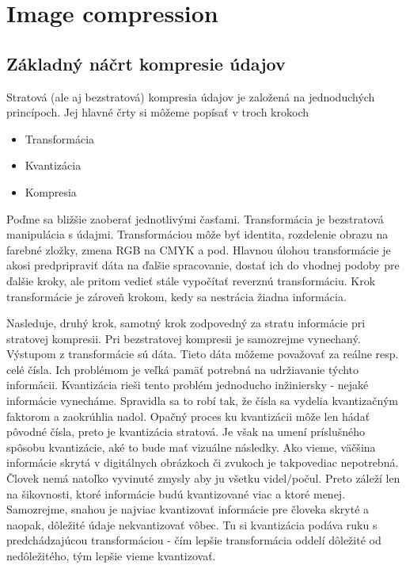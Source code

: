 \section{Image compression}

\subsection{Základný náčrt kompresie údajov}
Stratová (ale aj bezstratová) kompresia údajov je založená na
jednoduchých princípoch. Jej hlavné črty si môžeme popísať v troch
krokoch
\begin{itemize}
\item Transformácia
\item Kvantizácia
\item Kompresia
\end{itemize}
Poďme sa bližšie zaoberať jednotlivými časťami.
Transformácia je bezstratová manipulácia s údajmi. Transformáciou môže
byť identita, rozdelenie obrazu na farebné zložky, zmena RGB na CMYK a
pod. Hlavnou úlohou transformácie je akosi predpripraviť dáta na
ďalšie spracovanie, dostať ich do vhodnej podoby pre ďalšie kroky, ale
pritom vedieť stále vypočítať reverznú transformáciu. Krok
transformácie je zároveň krokom, kedy sa nestrácia žiadna informácia.

Nasleduje, druhý krok, samotný krok zodpovedný za stratu informácie
pri stratovej kompresii. Pri bezstratovej kompresii je samozrejme
vynechaný. Výstupom z transformácie sú dáta. Tieto dáta môžeme
považovať za reálne resp. celé čísla. Ich problémom je veľká pamäť
potrebná na udržiavanie týchto informácii. Kvantizácia rieši tento
problém jednoducho inžiniersky - nejaké informácie vynecháme.
Spravidla sa to robí tak, že čísla sa vydelia kvantizačným faktorom a
zaokrúhlia nadol. Opačný proces ku kvantizácii môže len hádať pôvodné
čísla, preto je kvantizácia stratová. Je však na umení príslušného
spôsobu kvantizácie, aké to bude mať vizuálne následky. Ako vieme,
väčšina informácie skrytá v digitálnych obrázkoch či zvukoch je
takpovediac nepotrebná. Človek nemá natoľko vyvinuté zmysly aby ju
všetku videl/počul. Preto záleží len na šikovnosti, ktoré informácie
budú kvantizované viac a ktoré menej. Samozrejme, snahou je najviac
kvantizovať informácie pre človeka skryté a naopak, dôležité údaje
nekvantizovať vôbec. Tu si kvantizácia podáva ruku s predchádzajúcou
transformáciou - čím lepšie transformácia oddelí dôležité od
nedôležitého, tým lepšie vieme kvantizovať.

